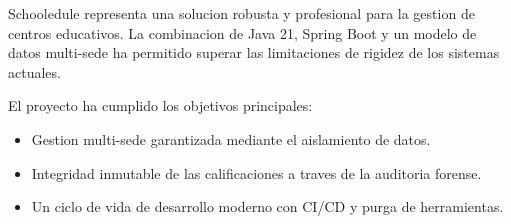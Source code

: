 Schooledule representa una solucion robusta y profesional para la gestion de centros educativos. La combinacion de Java 21, Spring Boot y un modelo de datos multi-sede ha permitido superar las limitaciones de rigidez de los sistemas actuales.

El proyecto ha cumplido los objetivos principales:
\begin{itemize}
    \item Gestion multi-sede garantizada mediante el aislamiento de datos.
    \item Integridad inmutable de las calificaciones a traves de la auditoria forense.
    \item Un ciclo de vida de desarrollo moderno con CI/CD y purga de herramientas.
\end{itemize}
